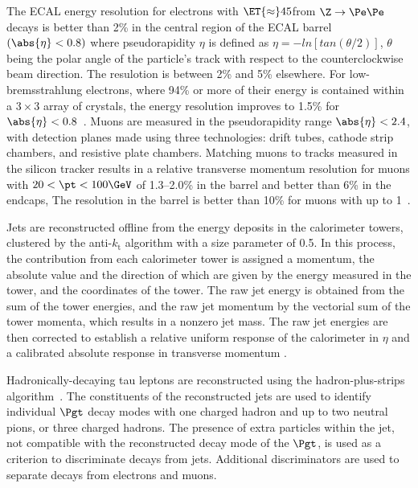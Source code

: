 The ECAL energy resolution for electrons with $\ET {\approx} 45$\GeV from $\Z \rightarrow \Pe \Pe$ decays is better than 2\% in the central region of the ECAL barrel $(\abs{\eta} < 0.8)$ where pseudorapidity $\eta$ is defined as $\eta = -ln [tan(\theta/2)]$,  $\theta$ being 
the polar angle of the particle's track with respect to the counterclockwise beam direction. The resulotion is between 2\% and 5\% elsewhere. For low-bremsstrahlung electrons, where 94\% or more of their energy is contained within a $3 \times 3$ array of crystals, the energy resolution improves to 1.5\% for $\abs{\eta} < 0.8$~\cite{CMS:2013hoa}. 
Muons are measured in the pseudorapidity range $\abs{\eta}< 2.4$, with detection planes made using three technologies: drift tubes, cathode strip chambers, and resistive plate chambers. Matching muons to tracks measured in the silicon tracker results in a relative transverse momentum resolution for muons with $20 <\pt < 100\GeV$ of 1.3--2.0\% in the barrel and better than 6\% in the endcaps, The \pt resolution in the barrel is better than 10\% for muons with \pt up to 1\TeV~\cite{Chatrchyan:2012xi}. 


Jets are reconstructed offline from the energy deposits in the calorimeter towers, clustered by the anti-$k_\mathrm{t}$ algorithm \cite{Cacciari:2008gp, Cacciari:2011ma} with a size parameter of 0.5. In this process, the contribution from each calorimeter tower is assigned a momentum, the absolute value and the direction of which are given by the energy measured in the tower, and the coordinates of the tower. The raw jet energy is obtained from the sum of the tower energies, and the raw jet momentum by the vectorial sum of the tower momenta, which results in a nonzero jet mass. The raw jet energies are then corrected to establish a relative uniform response of the calorimeter in $\eta$ and a calibrated absolute response in transverse momentum \pt. 



Hadronically-decaying tau leptons are reconstructed using the hadron-plus-strips algorithm~\cite{Chatrchyan:2012zz}. The constituents of the reconstructed jets are used to identify individual $\Pgt$ decay modes with one charged hadron and up to two neutral pions, or three charged hadrons. The presence of extra particles within the jet, not compatible with the reconstructed decay mode of the $\Pgt$, is used as a criterion to discriminate \Tau decays from jets. Additional discriminators are used to separate \Tau decays from electrons and muons.



